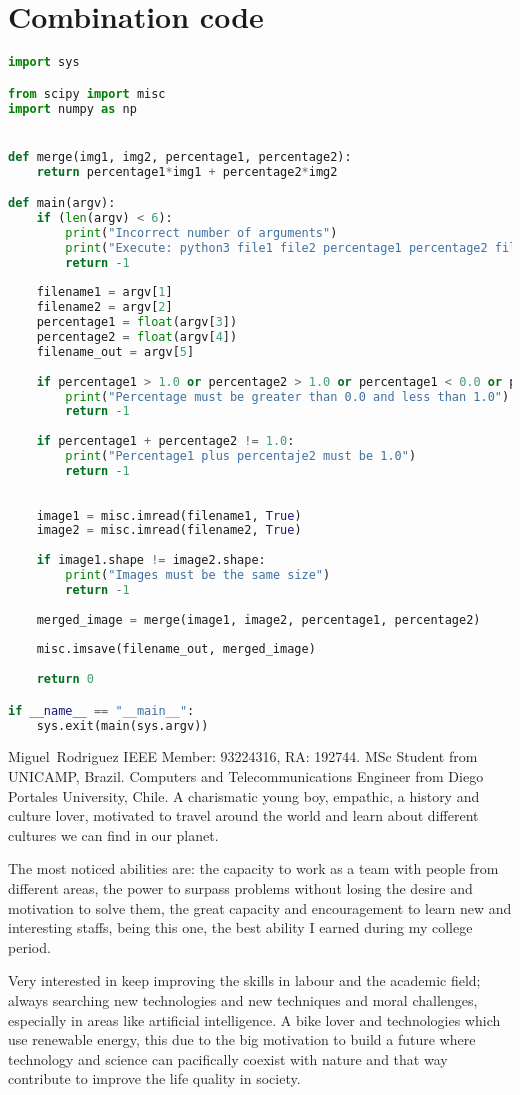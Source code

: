 \documentclass[journal]{IEEEtran}
\begin{document}
\section{Combination code}
\begin{lstlisting}[language=Python, caption=Combination code, label=list:combination_code]
import sys

from scipy import misc
import numpy as np


def merge(img1, img2, percentage1, percentage2):
	return percentage1*img1 + percentage2*img2

def main(argv):
	if (len(argv) < 6):
		print("Incorrect number of arguments")
		print("Execute: python3 file1 file2 percentage1 percentage2 filename_out")
		return -1
	
	filename1 = argv[1]
	filename2 = argv[2]
	percentage1 = float(argv[3])
	percentage2 = float(argv[4])
	filename_out = argv[5]
	
	if percentage1 > 1.0 or percentage2 > 1.0 or percentage1 < 0.0 or percentage2 < 0.0:
		print("Percentage must be greater than 0.0 and less than 1.0")
		return -1
	
	if percentage1 + percentage2 != 1.0:
		print("Percentage1 plus percentaje2 must be 1.0")
		return -1
	
	
	image1 = misc.imread(filename1, True)
	image2 = misc.imread(filename2, True)
	
	if image1.shape != image2.shape:
		print("Images must be the same size")
		return -1
	
	merged_image = merge(image1, image2, percentage1, percentage2)
	
	misc.imsave(filename_out, merged_image)
	
	return 0

if __name__ == "__main__":
	sys.exit(main(sys.argv))
\end{lstlisting}


\begin{IEEEbiography}{Miguel~Rodriguez}
	IEEE Member: 93224316, RA: 192744. MSc Student from UNICAMP, Brazil. Computers and Telecommunications Engineer from Diego Portales University, Chile. A charismatic young boy, empathic, a history and culture lover, motivated to travel around the world and learn about different cultures we can find in our planet. 
	
	The most noticed abilities are: the capacity to work as a team with people from different areas, the power to surpass problems without losing the desire and motivation to solve them, the great capacity and encouragement to learn new and interesting staffs, being this one, the best ability I earned during my college period. 
	
	Very interested in keep improving the skills in labour and the academic field; always searching new technologies and new techniques and moral challenges, especially in areas like artificial intelligence. A bike lover and technologies which use renewable energy, this due to the big motivation to build a future where technology and science can pacifically coexist with nature and that way contribute to improve the life quality in society.
\end{IEEEbiography}
\end{document}
